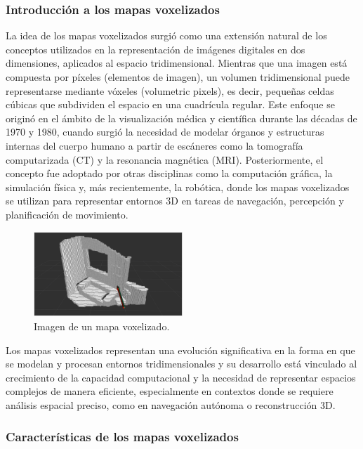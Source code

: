 \documentclass[12pt, a4paper, twoside]{article}
\begin{document}
\subsubsection{Introducción a los mapas voxelizados}
La idea de los mapas voxelizados surgió como una extensión natural de los conceptos utilizados en la representación 
de imágenes digitales en dos dimensiones, aplicados al espacio tridimensional. Mientras que una imagen está compuesta 
por píxeles (elementos de imagen), un volumen tridimensional puede representarse mediante vóxeles (volumetric pixels), 
es decir, pequeñas celdas cúbicas que subdividen el espacio en una cuadrícula regular. \newline
Este enfoque se originó en el ámbito de la visualización médica y científica durante las décadas de 1970 y 1980, 
cuando surgió la necesidad de modelar órganos y estructuras internas del cuerpo humano a partir de escáneres como la 
tomografía computarizada (CT) y la resonancia magnética (MRI). Posteriormente, el concepto fue adoptado por otras 
disciplinas como la computación gráfica, la simulación física y, más recientemente, la robótica, donde los mapas 
voxelizados se utilizan para representar entornos 3D en tareas de navegación, percepción y planificación de movimiento.
\begin{figure}[h]
  \centering
    \includegraphics[width=0.5\textwidth]{Voxel_map_example.png}
  \caption{Imagen de un mapa voxelizado.}
\end{figure} 
\newline
Los mapas voxelizados representan una evolución significativa en la forma en que se modelan y procesan entornos 
tridimensionales y su desarrollo está vinculado al crecimiento de la capacidad computacional y la necesidad de 
representar espacios complejos de manera eficiente, especialmente en contextos donde se requiere análisis espacial preciso, 
como en navegación autónoma o reconstrucción 3D.

\subsubsection{Características de los mapas voxelizados}
\end{document}
